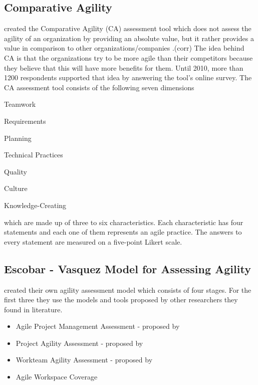 \subsection{Comparative Agility} %
\citet{comparative_agility} created the Comparative Agility (CA) assessment tool which does not assess the agility of an organization by providing an absolute value, but it rather provides a value in comparison to other organizations/companies \cite{comparative_agility_web}.(corr)  The idea behind CA is that the organizations try to be more agile than their competitors because they believe that this will have more benefits for them. Until 2010, more than 1200 respondents supported that idea by answering the tool's online survey. The CA assessment tool consists of the following seven dimensions
\begin{inparaenum} [a\upshape)]
	\item Teamwork
	\item Requirements
	\item Planning
	\item Technical Practices
	\item Quality
	\item Culture
	\item Knowledge-Creating
\end{inparaenum}
which are made up of three to six characteristics. Each characteristic has four statements and each one of them represents an agile practice. The answers to every statement are measured on a five-point Likert scale.

\subsection{Escobar - Vasquez Model for Assessing Agility} %

\citet{6427226} created their own agility assessment model which consists of four stages. For the first three they use the models and tools proposed by other researchers they found in literature.
\begin{itemize}
\item Agile Project Management Assessment - proposed by \citet{qumer2006measuring}
\item Project Agility Assessment - proposed by \citet{taylor}
\item Workteam Agility Assessment - proposed by \citet{Leffingwell}
\item Agile Workspace Coverage
\end{itemize}

